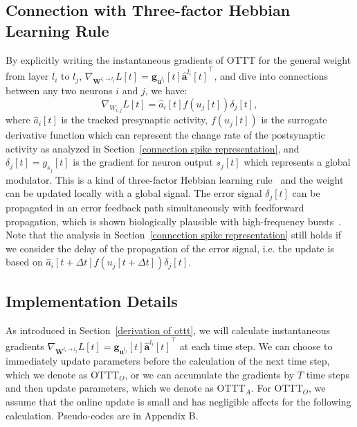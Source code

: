 \documentclass{article}
\begin{document}
\subsection{Connection with Three-factor Hebbian Learning Rule}\label{connection hebbian}
\vspace{-2mm}
By explicitly writing the instantaneous gradients of OTTT for the general weight from layer $l_i$ to $l_j$,  $\nabla_{\mathbf{W}^{l_i\rightarrow l_j}}L[t]=\mathbf{g}_{\mathbf{u}^{l_j}}[t]{\hat{\mathbf{a}}^{l_i}[t]}^\top$, and dive into connections between any two neurons $i$ and $j$, we have:
\vspace{-1.5mm}
\begin{equation}
    \nabla_{W_{i,j}}L[t] = \hat{a}_i[t] f(u_j[t]) \delta_j[t],
\end{equation}
where $\hat{a}_i[t]$ is the tracked presynaptic activity, $f(u_j[t])$ is the surrogate derivative function which can represent the change rate of the postsynaptic activity as analyzed in Section~\ref{connection spike representation}, and $\delta_j[t]=g_{s_j}[t]$ is the gradient for neuron output $s_j[t]$ which represents a global modulator. This is a kind of three-factor Hebbian learning rule~\cite{fremaux2016neuromodulated} and the weight can be updated locally with a global signal. The error signal $\delta_j[t]$ can be propagated in an error feedback path simultaneously with feedforward propagation, which is shown biologically plausible with high-frequency bursts~\cite{payeur2021burst}. Note that the analysis in Section~\ref{connection spike representation} still holds if we consider the delay of the propagation of the error signal, i.e. the update is based on $\hat{a}_i[t+\Delta t] f(u_j[t+\Delta t]) \delta_j[t]$.

\vspace{-2mm}
\subsection{Implementation Details}\label{implementation details}
\vspace{-2mm}

As introduced in Section~\ref{derivation of ottt}, we will calculate instantaneous gradients $\nabla_{\mathbf{W}^{l_i\rightarrow l_j}}L[t]=\mathbf{g}_{\mathbf{u}^{l_j}}[t]{\hat{\mathbf{a}}^{l_i}[t]}^\top$ at each time step. We can choose to immediately update parameters before the calculation of the next time step, which we denote as OTTT$_O$, or we can accumulate the gradients by $T$ time steps and then update parameters, which we denote as OTTT$_A$. For OTTT$_O$, we assume that the online update is small and has negligible affects for the following calculation. Pseudo-codes are in Appendix B.
\end{document}
